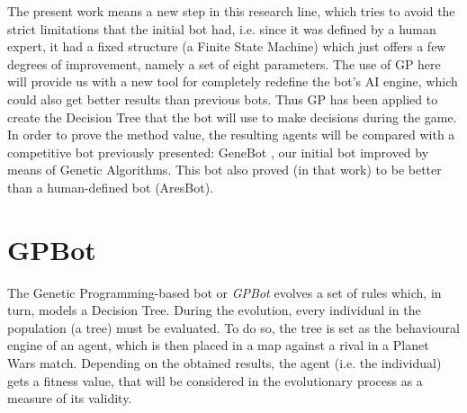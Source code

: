 \documentclass[preprint]{elsarticle}
\begin{document}

The present work means a new step in this research line, which tries to avoid the strict limitations that the initial bot had, i.e. since it was defined by a human expert, it had a fixed structure (a Finite State Machine) which just offers a few degrees of improvement, namely a set of eight parameters.
The use of GP here will provide us with a new tool for completely redefine the bot's AI engine, which could also get better results than previous bots.
Thus GP has been applied to create the Decision Tree that the bot will use to make decisions during the game.
In order to prove the method value, the resulting agents will be compared with a competitive bot previously presented: GeneBot \cite{Genebot_CEC11}, our initial bot improved by means of Genetic Algorithms. This bot also proved (in that work) to be better than a human-defined bot (AresBot).


\section{GPBot}
\label{sec:agent}


The Genetic Programming-based bot or {\em GPBot} \cite{Garcia14Treedepth} evolves a set of rules which, in turn, models a Decision Tree.
During the evolution, every individual in the population (a tree) must be evaluated. To do so, the tree is set as the behavioural engine of an agent, which is then placed in a map against a rival in a Planet Wars match. Depending on the obtained results, the agent (i.e. the individual) gets a fitness value, that will be considered in the evolutionary process as a measure of its validity. 
 
\end{document}
